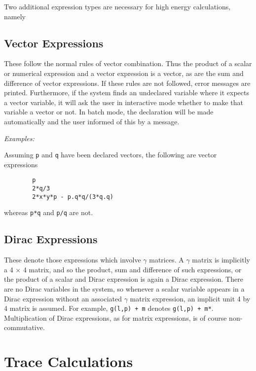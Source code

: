 Two additional expression types are necessary for high energy
calculations, namely

\subsection{Vector Expressions}

These follow the normal rules of vector combination. Thus the product of a
scalar or numerical expression and a vector expression is a vector, as are
the sum and difference of vector expressions. If these rules are not
followed, error messages are printed. Furthermore, if the system finds an
undeclared variable where it expects a vector variable, it will ask the
user in interactive mode whether to make that variable a vector or not. In
batch mode, the declaration will be made automatically and the user
informed of this by a message.

\textit{Examples:}

Assuming \texttt{p} and \texttt{q} have been declared vectors, the following are
vector expressions
\begin{verbatim}
        p
        2*q/3
        2*x*y*p - p.q*q/(3*q.q)
\end{verbatim}
whereas \texttt{p*q} and \texttt{p/q} are not.

\subsection{Dirac Expressions}

These denote those expressions which involve $\gamma$ matrices. A $\gamma$
matrix is implicitly a 4 $\times$ 4 matrix, and so the product, sum and
difference of such expressions, or the product of a scalar and Dirac
expression is again a Dirac expression.  There are no Dirac variables in
the system, so whenever a scalar variable appears in a Dirac expression
without an associated $\gamma$ matrix expression, an implicit unit 4
by 4 matrix is assumed.  For example, \texttt{g(l,p) + m} denotes
\texttt{g(l,p) + m*}.  Multiplication of Dirac
expressions, as for matrix expressions, is of course non-commutative.

\section{Trace Calculations}
\hypertarget{command:NOSPUR}{}
\hypertarget{command:SPUR}{}

